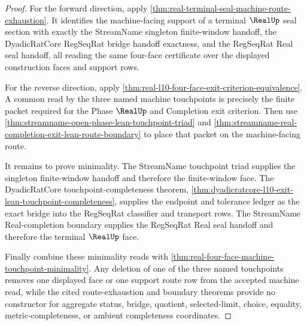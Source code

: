 \begin{proof}
For the forward direction, apply \autoref{thm:real-terminal-seal-machine-route-exhaustion}. It identifies the machine-facing support of a terminal $\RealUp$ seal section with exactly the StreamName singleton finite-window handoff, the DyadicRatCore RegSeqRat bridge handoff exactness, and the RegSeqRat Real seal handoff, all reading the same four-face certificate over the displayed construction faces and support rows.

For the reverse direction, apply \autoref{thm:real-l10-four-face-exit-criterion-equivalence}. A common read by the three named machine touchpoints is precisely the finite packet required for the Phase $\RealUp$ and Completion exit criterion. Then use \autoref{thm:streamname-open-phase-lean-touchpoint-triad} and \autoref{thm:streamname-real-completion-exit-lean-route-boundary} to place that packet on the machine-facing route.

It remains to prove minimality. The StreamName touchpoint triad supplies the singleton finite-window handoff and therefore the finite-window face. The DyadicRatCore touchpoint-completeness theorem, \autoref{thm:dyadicratcore-l10-exit-lean-touchpoint-completeness}, supplies the endpoint and tolerance ledger as the exact bridge into the RegSeqRat classifier and transport rows. The StreamName Real-completion boundary supplies the RegSeqRat Real seal handoff and therefore the terminal $\RealUp$ face.

Finally combine these minimality reads with \autoref{thm:real-four-face-machine-touchpoint-minimality}. Any deletion of one of the three named touchpoints removes one displayed face or one support route row from the accepted machine read, while the cited route-exhaustion and boundary theorems provide no constructor for aggregate status, bridge, quotient, selected-limit, choice, equality, metric-completeness, or ambient completeness coordinates.
\end{proof}
